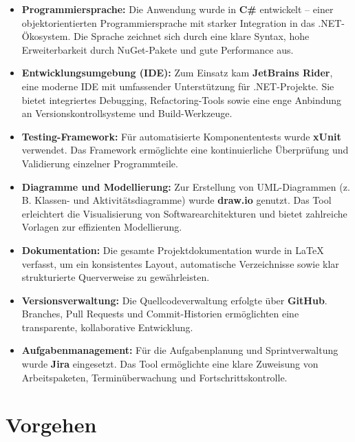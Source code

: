 \documentclass[a4paper,12pt]{article}
\begin{document}
\begin{itemize}
    \item \textbf{Programmiersprache:} Die Anwendung wurde in \textbf{C\#} entwickelt – einer objektorientierten Programmiersprache mit starker Integration in das .NET-Ökosystem. Die Sprache zeichnet sich durch eine klare Syntax, hohe Erweiterbarkeit durch NuGet-Pakete und gute Performance aus.

    \item \textbf{Entwicklungsumgebung (IDE):} Zum Einsatz kam \textbf{JetBrains Rider}, eine moderne IDE mit umfassender Unterstützung für .NET-Projekte. Sie bietet integriertes Debugging, Refactoring-Tools sowie eine enge Anbindung an Versionskontrollsysteme und Build-Werkzeuge.

    \item \textbf{Testing-Framework:} Für automatisierte Komponententests wurde \textbf{xUnit} verwendet. Das Framework ermöglichte eine kontinuierliche Überprüfung und Validierung einzelner Programmteile.

    \item \textbf{Diagramme und Modellierung:} Zur Erstellung von UML-Diagrammen (z.\,B. Klassen- und Aktivitätsdiagramme) wurde \textbf{draw.io} genutzt. Das Tool erleichtert die Visualisierung von Softwarearchitekturen und bietet zahlreiche Vorlagen zur effizienten Modellierung.

    \item \textbf{Dokumentation:} Die gesamte Projektdokumentation wurde in \LaTeX{} verfasst, um ein konsistentes Layout, automatische Verzeichnisse sowie klar strukturierte Querverweise zu gewährleisten.

    \item \textbf{Versionsverwaltung:} Die Quellcodeverwaltung erfolgte über \textbf{GitHub}. Branches, Pull Requests und Commit-Historien ermöglichten eine transparente, kollaborative Entwicklung.

    \item \textbf{Aufgabenmanagement:} Für die Aufgabenplanung und Sprintverwaltung wurde \textbf{Jira} eingesetzt. Das Tool ermöglichte eine klare Zuweisung von Arbeitspaketen, Terminüberwachung und Fortschrittskontrolle.
\end{itemize}


\newpage

\section{Vorgehen}
\end{document}
